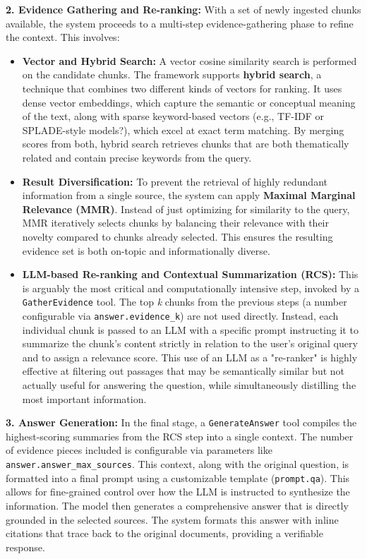 \textbf{2. Evidence Gathering and Re-ranking:}
With a set of newly ingested chunks available, the system proceeds to a multi-step evidence-gathering phase to refine the context. This involves:
\begin{itemize}
    \item \textbf{Vector and Hybrid Search:} A vector cosine similarity search is performed on the candidate chunks. The framework supports \textbf{hybrid search}, a technique that combines two different kinds of vectors for ranking. It uses dense vector embeddings, which capture the semantic or conceptual meaning of the text, along with sparse keyword-based vectors (e.g., TF-IDF or SPLADE-style models?), which excel at exact term matching. By merging scores from both, hybrid search retrieves chunks that are both thematically related and contain precise keywords from the query. 
    \item \textbf{Result Diversification:} To prevent the retrieval of highly redundant information from a single source, the system can apply \textbf{Maximal Marginal Relevance (MMR)}. Instead of just optimizing for similarity to the query, MMR iteratively selects chunks by balancing their relevance with their novelty compared to chunks already selected. This ensures the resulting evidence set is both on-topic and informationally diverse.
    \item \textbf{LLM-based Re-ranking and Contextual Summarization (RCS):} This is arguably the most critical and computationally intensive step, invoked by a \texttt{GatherEvidence} tool. The top \textit{k} chunks from the previous steps (a number configurable via \texttt{answer.evidence\_k}) are not used directly. Instead, each individual chunk is passed to an LLM with a specific prompt instructing it to summarize the chunk's content strictly in relation to the user's original query and to assign a relevance score. This use of an LLM as a "re-ranker" is highly effective at filtering out passages that may be semantically similar but not actually useful for answering the question, while simultaneously distilling the most important information.
\end{itemize}

\textbf{3. Answer Generation:}
In the final stage, a \texttt{GenerateAnswer} tool compiles the highest-scoring summaries from the RCS step into a single context. The number of evidence pieces included is configurable via parameters like \texttt{answer.answer\_max\_sources}. This context, along with the original question, is formatted into a final prompt using a customizable template (\texttt{prompt.qa}). This allows for fine-grained control over how the LLM is instructed to synthesize the information. The model then generates a comprehensive answer that is directly grounded in the selected sources. The system formats this answer with inline citations that trace back to the original documents, providing a verifiable response. \\

